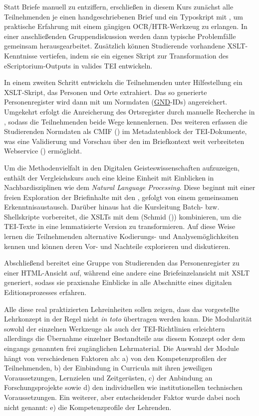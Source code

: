 \documentclass[
          a4paper,
        ]{article}
\begin{document}
Statt Briefe manuell zu entziffern, erschließen in diesem Kurs zunächst
alle Teilnehmenden je einen handgeschriebenen Brief und ein Typoskript
mit , um praktische Erfahrung mit einem gängigen OCR/HTR-Werkzeug zu
erlangen. In einer anschließenden Gruppendiskussion werden dann typische
Problemfälle gemeinsam herausgearbeitet. Zusätzlich können Studierende
vorhandene XSLT-Kenntnisse vertiefen, indem sie ein eigenes Skript zur
Transformation des eScriptorium-Outputs in valides TEI entwickeln.

In einem zweiten Schritt entwickeln die Teilnehmenden unter
Hilfestellung ein XSLT-Skript, das Personen und Orte extrahiert. Das so
generierte Personenregister wird dann mit um Normdaten
(\href{https://gnd.network/}{GND}-IDs) angereichert. Umgekehrt erfolgt
die Anreicherung des Ortsregister durch manuelle Recherche in , sodass
die Teilnehmenden beide Wege kennenlernen. Des weiteren erfassen die
Studierenden Normdaten als CMIF () im Metadatenblock der TEI-Dokumente, was eine Validierung und
Vorschau über den im Briefkontext weit verbreiteten Webservice
() ermöglicht.

Um die Methodenvielfalt in den Digitalen Geisteswissenschaften
aufzuzeigen, enthält der Vergleichskurs auch eine kleine Einheit mit
Einblicken in Nachbardisziplinen wie dem \emph{Natural Language
Processing}. Diese beginnt mit einer freien Exploration der Briefinhalte
mit den , gefolgt von einem gemeinsamen Erkenntnisaustausch. Darüber
hinaus hat die Kursleitung Batch- bzw. Shellskripte vorbereitet, die
XSLTs mit dem (Schmid ()) kombinieren,
um die TEI-Texte in eine lemmatisierte Version zu transformieren. Auf
diese Weise lernen die Teilnehmenden alternative Kodierungs- und
Analysemöglichkeiten kennen und können deren Vor- und Nachteile
explorieren und diskutieren.

Abschließend bereitet eine Gruppe von Studierenden das Personenregister
zu einer HTML-Ansicht auf, während eine andere eine Briefeinzelansicht
mit XSLT generiert, sodass sie praxisnahe Einblicke in alle Abschnitte
eines digitalen Editionsprozesses erfahren.

Alle diese real praktizierten Lehreinheiten sollen zeigen, dass das
vorgestellte Lehrkonzept in der Regel nicht \emph{in toto} übertragen
werden kann. Die Modularität sowohl der einzelnen Werkzeuge als auch der
TEI-Richtlinien erleichtern allerdings die Übernahme einzelner
Bestandteile aus diesem Konzept oder dem eingangs genannten frei
zugänglichen Lehrmaterial. Die Auswahl der Module hängt von
verschiedenen Faktoren ab: a) von den Kompetenzprofilen der
Teilnehmenden, b) der Einbindung in Curricula mit ihren jeweiligen
Voraussetzungen, Lernzielen und Zeitgerüsten, c) der Anbindung an
Forschungsprojekte sowie d) den individuellen wie institutionellen
technischen Voraussetzungen. Ein weiterer, aber entscheidender Faktor
wurde dabei noch nicht genannt: e) die Kompetenzprofile der Lehrenden.
\end{document}
